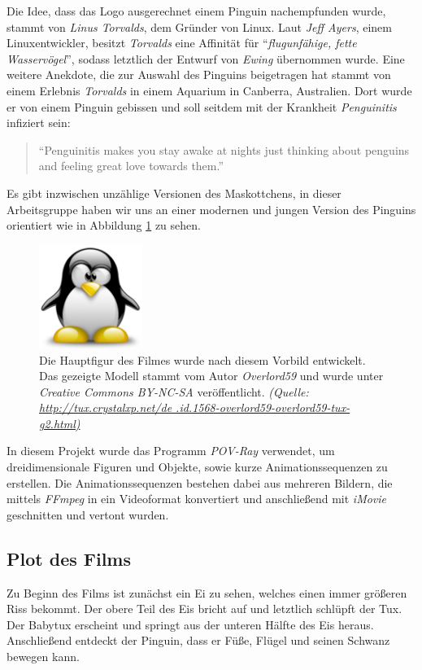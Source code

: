 \documentclass[11pt,parskip]{scrartcl}
\begin{document}
Die Idee, dass das Logo ausgerechnet einem Pinguin nachempfunden wurde, stammt
von \emph{Linus Torvalds}, dem Gründer von Linux. Laut \emph{Jeff Ayers}, einem
Linuxentwickler, besitzt \emph{Torvalds} eine Affinität für
\enquote{\emph{flugunfähige, fette Wasservögel}}, sodass letztlich der Entwurf
von \emph{Ewing} übernommen wurde. Eine weitere Anekdote, die zur Auswahl des
Pinguins beigetragen hat stammt von einem Erlebnis \emph{Torvalds} in einem
Aquarium in Canberra, Australien. Dort wurde er von einem Pinguin gebissen und
soll seitdem mit der Krankheit \emph{Penguinitis} infiziert sein:
%
\begin{quote}
  \enquote{Penguinitis makes you stay awake at nights just thinking about
    penguins and feeling great love towards them.} \cite{tuxstory}
\end{quote}
%
Es gibt inzwischen unzählige Versionen des Maskottchens, in dieser
Arbeitsgruppe haben wir uns an einer modernen und jungen Version des Pinguins
orientiert wie in Abbildung \ref{fig:overlord59tux} zu sehen.
%
\begin{figure}[htbp]
  \centering
  \includegraphics[width=0.3\textwidth]{./fig/overlord59tux.pdf}
  \caption{
    Die Hauptfigur des Filmes wurde nach diesem Vorbild entwickelt. Das
    gezeigte Modell stammt vom Autor \emph{Overlord59} und wurde unter
    \emph{Creative Commons BY-NC-SA} veröffentlicht.
    \emph{
      (Quelle:
      \url{http://tux.crystalxp.net/de
        .id.1568-overlord59-overlord59-tux-g2.html)
      }
    }
  }
  \label{fig:overlord59tux}
\end{figure}
%
In diesem Projekt wurde das Programm \emph{POV-Ray} verwendet, um
dreidimensionale Figuren und Objekte, sowie kurze Animationssequenzen zu
erstellen. Die Animationssequenzen bestehen dabei aus mehreren Bildern, die
mittels \emph{FFmpeg} in ein Videoformat konvertiert und anschließend mit
\emph{iMovie} geschnitten und vertont wurden.


\subsection{Plot des Films}
Zu Beginn des Films ist zunächst ein Ei zu sehen, welches einen immer größeren
Riss bekommt. Der obere Teil des Eis bricht auf und letztlich schlüpft der Tux.
Der Babytux erscheint und springt aus der unteren Hälfte des Eis heraus.
Anschließend entdeckt der Pinguin, dass er Füße, Flügel und seinen Schwanz
bewegen kann.
\end{document}
